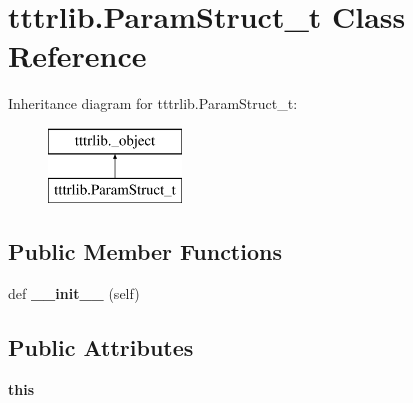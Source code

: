 \hypertarget{classtttrlib_1_1_param_struct__t}{}\section{tttrlib.\+Param\+Struct\+\_\+t Class Reference}
\label{classtttrlib_1_1_param_struct__t}
Inheritance diagram for tttrlib.\+Param\+Struct\+\_\+t\+:\begin{figure}[H]
\begin{center}
\leavevmode
\includegraphics[height=2.000000cm]{classtttrlib_1_1_param_struct__t}
\end{center}
\end{figure}
\subsection*{Public Member Functions}
\begin{DoxyCompactItemize}
\item 
\mbox{\label{classtttrlib_1_1_param_struct__t_aeca5d9a3ab05f0ec7c2691556858604f}} 
def {\bfseries \+\_\+\+\_\+init\+\_\+\+\_\+} (self)
\end{DoxyCompactItemize}
\subsection*{Public Attributes}
\begin{DoxyCompactItemize}
\item 
\mbox{\label{classtttrlib_1_1_param_struct__t_a1e0e43a57aafaa54d209079d77c59407}} 
{\bfseries this}
\end{DoxyCompactItemize}
